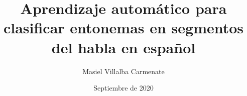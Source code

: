\documentclass[11pt,oneside]{uhthesis}
\title{Aprendizaje autom\'atico para clasificar entonemas en segmentos del habla en espa\~nol}
\author{Masiel Villalba Carmenate}
\date{Septiembre de 2020}
\begin{document}
\frontmatter
\maketitle
\renewcommand{\bibname}{Referencias}

%




\mainmatter







\backmatter





\end{document}
